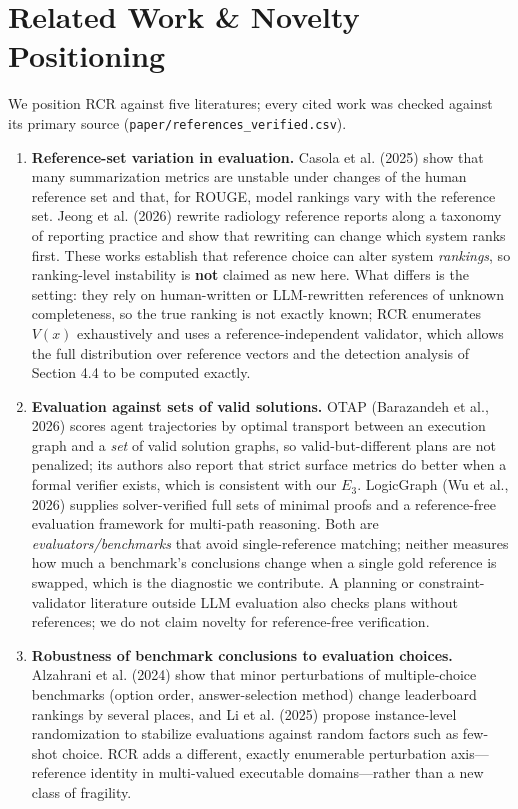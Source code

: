 \documentclass[11pt]{article}
\begin{document}
\section{Related Work \& Novelty Positioning}
We position RCR against five literatures; every cited work was checked against its primary source (\texttt{paper/references\_verified.csv}).

\begin{enumerate}
\item \textbf{Reference-set variation in evaluation.} Casola et al. (2025) show that many summarization metrics are unstable under changes of the human reference set and that, for ROUGE, model rankings vary with the reference set. Jeong et al. (2026) rewrite radiology reference reports along a taxonomy of reporting practice and show that rewriting can change which system ranks first. These works establish that reference choice can alter system \emph{rankings}, so ranking-level instability is \textbf{not} claimed as new here. What differs is the setting: they rely on human-written or LLM-rewritten references of unknown completeness, so the true ranking is not exactly known; RCR enumerates $V(x)$ exhaustively and uses a reference-independent validator, which allows the full distribution over reference vectors and the detection analysis of Section 4.4 to be computed exactly.
\item \textbf{Evaluation against sets of valid solutions.} OTAP (Barazandeh et al., 2026) scores agent trajectories by optimal transport between an execution graph and a \emph{set} of valid solution graphs, so valid-but-different plans are not penalized; its authors also report that strict surface metrics do better when a formal verifier exists, which is consistent with our $E_3$. LogicGraph (Wu et al., 2026) supplies solver-verified full sets of minimal proofs and a reference-free evaluation framework for multi-path reasoning. Both are \emph{evaluators/benchmarks} that avoid single-reference matching; neither measures how much a benchmark's conclusions change when a single gold reference is swapped, which is the diagnostic we contribute. A planning or constraint-validator literature outside LLM evaluation also checks plans without references; we do not claim novelty for reference-free verification.
\item \textbf{Robustness of benchmark conclusions to evaluation choices.} Alzahrani et al. (2024) show that minor perturbations of multiple-choice benchmarks (option order, answer-selection method) change leaderboard rankings by several places, and Li et al. (2025) propose instance-level randomization to stabilize evaluations against random factors such as few-shot choice. RCR adds a different, exactly enumerable perturbation axis---reference identity in multi-valued executable domains---rather than a new class of fragility.

\end{enumerate}
\end{document}

